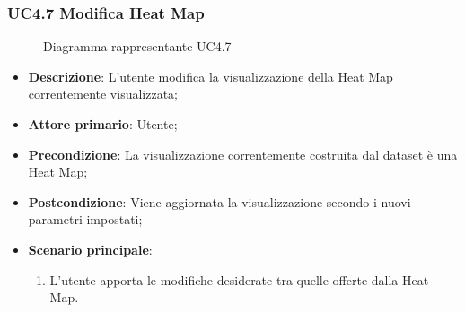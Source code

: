 \newpage
\subsubsection{UC4.7 Modifica Heat Map}
\label{ssub:uc4.7}
\begin{figure}[h]
    \centering
    \caption{Diagramma rappresentante UC4.7}
    \label{fig:UC4.7}
\end{figure}


\begin{itemize}
    \item \textbf{Descrizione}: L’utente modifica la visualizzazione della Heat Map correntemente visualizzata;
	
    \item \textbf{Attore primario}: Utente;
    
    \item \textbf{Precondizione}:   La visualizzazione correntemente costruita dal dataset è una Heat Map;

    \item \textbf{Postcondizione}:  Viene aggiornata la visualizzazione secondo i nuovi parametri impostati;

	\item \textbf{Scenario principale}:
		\begin{enumerate}
            \item L'utente apporta le modifiche desiderate tra quelle offerte dalla Heat Map.
        \end{enumerate}
\end{itemize}

